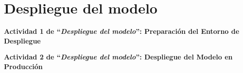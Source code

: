\section{Despliegue del modelo}
\textbf{Actividad 1 de “\textit{Despliegue del modelo}”: Preparación del Entorno de Despliegue}

\textbf{Actividad 2 de “\textit{Despliegue del modelo}”: Despliegue del Modelo en Producción}
